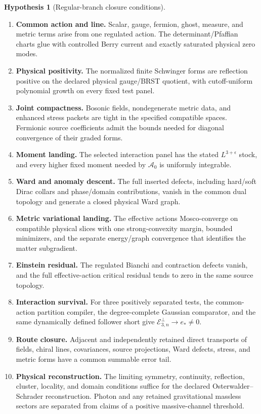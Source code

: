 \documentclass[11pt,a4paper,oneside]{book}
\theoremstyle{plain}
\theoremstyle{definition}
\newtheorem{assumption}[theorem]{Hypothesis}
\theoremstyle{remark}
\renewcommand{\AA}{\mathcal A}
\newcommand{\src}[2]{\cite{#1}}
\begin{document}
\begin{assumption}[Regular-branch closure conditions]
\label{ass:closure}
\begin{enumerate}[label=\textbf{C\arabic*.},leftmargin=3em]
\item \textbf{Common action and line.} Scalar, gauge, fermion, ghost, measure, and metric terms arise from one regulated action. The determinant/Pfaffian charts glue with controlled Berry current and exactly saturated physical zero modes.
\item \textbf{Physical positivity.} The normalized finite Schwinger forms are reflection positive on the declared physical gauge/BRST quotient, with cutoff-uniform polynomial growth on every fixed test panel.
\item \textbf{Joint compactness.} Bosonic fields, nondegenerate metric data, and enhanced stress packets are tight in the specified compatible spaces. Fermionic source coefficients admit the bounds needed for diagonal convergence of their graded forms.
\item \textbf{Moment landing.} The selected interaction panel has the stated $L^{3+\epsilon}$ stock, and every higher fixed moment needed by $\AA_0$ is uniformly integrable.
\item \textbf{Ward and anomaly descent.} The full inserted defects, including hard/soft Dirac collars and phase/domain contributions, vanish in the common dual topology and generate a closed physical Ward graph.
\item \textbf{Metric variational landing.} The effective actions Mosco-converge on compatible physical slices with one strong-convexity margin, bounded minimizers, and the separate energy/graph convergence that identifies the matter subgradient.
\item \textbf{Einstein residual.} The regulated Bianchi and contraction defects vanish, and the full effective-action critical residual tends to zero in the same source topology.
\item \textbf{Interaction survival.} For three positively separated tests, the common-action partition compiler, the degree-complete Gaussian comparator, and the same dynamically defined follower short give $\mathcal E_{3,n}^{\perp}\to e_*\ne0$.
\item \textbf{Route closure.} Adjacent and independently retained direct transports of fields, chiral lines, covariances, source projections, Ward defects, stress, and metric forms have a common summable error tail.
\item \textbf{Physical reconstruction.} The limiting symmetry, continuity, reflection, cluster, locality, and domain conditions suffice for the declared Osterwalder--Schrader reconstruction. Photon and any retained gravitational massless sectors are separated from claims of a positive massive-channel threshold.
\end{enumerate}
\end{assumption}
\src{R18}{def:v18v51-hypotheses}
\end{document}
